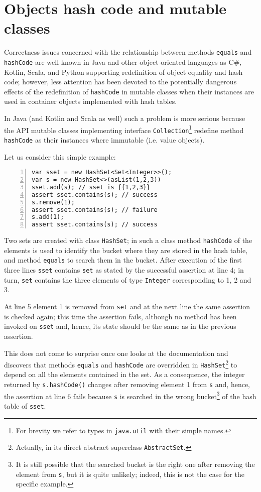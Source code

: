\section{Objects hash code and mutable classes}

Correctness issues concerned with the relationship between methods \lstinline{equals} and \lstinline{hashCode} are well-known
in Java \cite{Bloch18,OkanoHSON19} and other object-oriented languages as C\#, Kotlin, Scala, and Python supporting redefinition
of object equality and hash code; however, less attention has been devoted to the potentially dangerous effects of the redefinition of 
\lstinline{hashCode} in mutable classes when their instances are used in container objects implemented with hash tables.

In Java (and Kotlin and Scala as well)  such a problem is more serious because the API mutable classes implementing interface \lstinline{Collection}\footnote{For brevity we refer to types in \lstinline{java.util} with their simple names.} redefine method \lstinline{hashCode} as their instances where immutable (i.e. value objects).

Let us consider this simple example:
\begin{lstlisting}[numbers=left]
var sset = new HashSet<Set<Integer>>();
var s = new HashSet<>(asList(1,2,3))
sset.add(s); // sset is {{1,2,3}}
assert sset.contains(s); // success
s.remove(1);
assert sset.contains(s); // failure
s.add(1);
assert sset.contains(s); // success
\end{lstlisting}
Two sets are created with class \lstinline{HashSet}; in such a class method \lstinline{hashCode} of the elements is used to identify the
bucket where they are stored in the hash table, and method \lstinline{equals} to search them in the bucket.
After execution of the first three lines \lstinline{sset} contains \lstinline{set} as stated by the successful assertion at line 4; in turn, \lstinline{set}
contains the three elements of type \lstinline{Integer} corresponding to 1, 2 and 3.

At line 5 element 1 is removed from \lstinline{set} and at the next line the same assertion is checked again; this time the assertion fails, although no method has been invoked on \lstinline{sset} and, hence, its state should be the same as in the previous assertion.

This does not come to surprise once one looks at the documentation and discovers that methods \lstinline{equals} and \lstinline{hashCode} are overridden in \lstinline{HashSet}\footnote{Actually, in its direct abstract superclass \lstinline{AbstractSet}.} to depend on all the elements contained in the set. As a consequence, the integer returned by  \lstinline{s.hashCode()} changes after removing element 1 from \lstinline{s} and, hence, the assertion at line 6 fails because \lstinline{s} is searched in the wrong bucket\footnote{It is still possible that the searched bucket is the right one after removing the element from \lstinline{s}, but it is quite unlikely; indeed, this is not the case for the specific example.} of the hash table of \lstinline{sset}.


